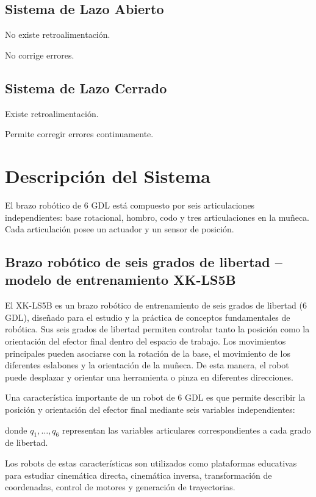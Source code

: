 \documentclass[11pt]{article}
\begin{document}
\subsection{Sistema de Lazo Abierto}

No existe retroalimentación.

No corrige errores.

\subsection{Sistema de Lazo Cerrado}

Existe retroalimentación.

Permite corregir errores continuamente.

\section{Descripción del Sistema}

El brazo robótico de 6 GDL está compuesto por seis articulaciones independientes: base rotacional, hombro, codo y tres articulaciones en la muñeca. Cada articulación posee un actuador y un sensor de posición.

\subsection{Brazo robótico de seis grados de libertad – modelo de entrenamiento XK-LS5B}

El XK-LS5B es un brazo robótico de entrenamiento de seis grados de libertad (6 GDL), diseñado para el estudio y la práctica de conceptos fundamentales de robótica. Sus seis grados de libertad permiten controlar tanto la posición como la orientación del efector final dentro del espacio de trabajo. Los movimientos principales pueden asociarse con la rotación de la base, el movimiento de los diferentes eslabones y la orientación de la muñeca. De esta manera, el robot puede desplazar y orientar una herramienta o pinza en diferentes direcciones.

Una característica importante de un robot de 6 GDL es que permite describir la posición y orientación del efector final mediante seis variables independientes:



donde $q_1, \ldots, q_6$ representan las variables articulares correspondientes a cada grado de libertad.

Los robots de estas características son utilizados como plataformas educativas para estudiar cinemática directa, cinemática inversa, transformación de coordenadas, control de motores y generación de trayectorias.
\end{document}
